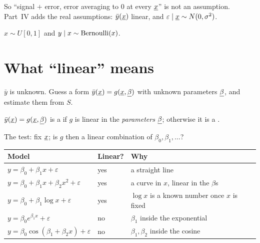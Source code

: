So ``signal $+$ error, error averaging to $0$ at every $\underline{x}$'' is not an assumption. Part~IV adds the real assumptions: $\bar y(\underline{x})$ linear, and $\varepsilon\mid\underline{x}\sim N(0,\sigma^2)$.

\begin{example}
$x\sim U[0,1]$ and $y\mid x\sim\text{Bernoulli}(x)$.
\begin{deriv}
\end{deriv}
\end{example}

\section{What ``linear'' means}

$\bar y$ is unknown. Guess a form $\bar y(\underline{x})=g(\underline{x},\underline{\beta})$ with unknown parameters $\underline{\beta}$, and estimate them from $S$.

\begin{definition}
$\bar y(\underline{x})=g(\underline{x},\underline{\beta})$ is a  if $g$ is linear in the \emph{parameters} $\underline{\beta}$; otherwise it is a .
\end{definition}

The test: fix $\underline{x}$; is $g$ then a linear combination of $\beta_0,\beta_1,\dots$?
\begin{center}
\renewcommand{\arraystretch}{1.3}
\begin{tabular}{@{}lll@{}}
\toprule
Model & Linear? & Why \\
\midrule
$y=\beta_0+\beta_1x+\varepsilon$ & yes & a straight line \\
$y=\beta_0+\beta_1x+\beta_2x^2+\varepsilon$ & yes & a curve in $x$, linear in the $\beta$s \\
$y=\beta_0+\beta_1\log x+\varepsilon$ & yes & $\log x$ is a known number once $x$ is fixed \\
$y=\beta_0e^{\beta_1x}+\varepsilon$ & no & $\beta_1$ inside the exponential \\
$y=\beta_0\cos(\beta_1+\beta_2x)+\varepsilon$ & no & $\beta_1,\beta_2$ inside the cosine \\
\bottomrule
\end{tabular}
\end{center}

